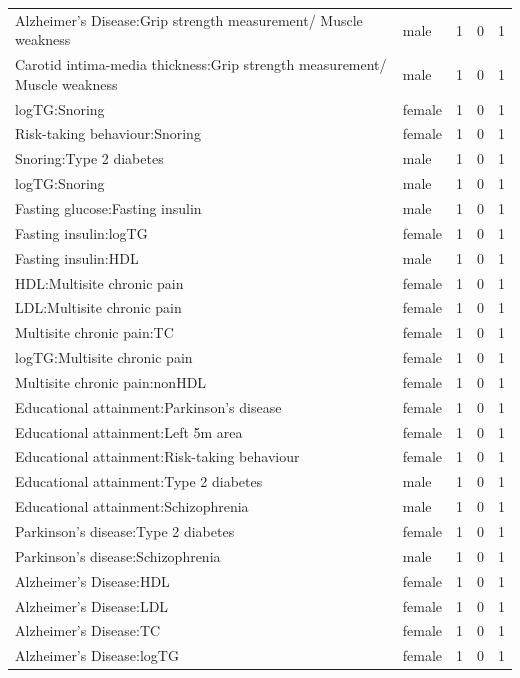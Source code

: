 \begin{table}[ht]
\begin{tabular}{llrrr}
  Alzheimer's Disease:Grip strength measurement/ Muscle weakness & male &   1 &   0 &   1 \\ 
  Carotid intima-media thickness:Grip strength measurement/ Muscle weakness & male &   1 &   0 &   1 \\ 
  logTG:Snoring & female &   1 &   0 &   1 \\ 
  Risk-taking behaviour:Snoring & female &   1 &   0 &   1 \\ 
  Snoring:Type 2 diabetes & male &   1 &   0 &   1 \\ 
  logTG:Snoring & male &   1 &   0 &   1 \\ 
  Fasting glucose:Fasting insulin & male &   1 &   0 &   1 \\ 
  Fasting insulin:logTG & female &   1 &   0 &   1 \\ 
  Fasting insulin:HDL & male &   1 &   0 &   1 \\ 
  HDL:Multisite chronic pain & female &   1 &   0 &   1 \\ 
  LDL:Multisite chronic pain & female &   1 &   0 &   1 \\ 
  Multisite chronic pain:TC & female &   1 &   0 &   1 \\ 
  logTG:Multisite chronic pain & female &   1 &   0 &   1 \\ 
  Multisite chronic pain:nonHDL & female &   1 &   0 &   1 \\ 
  Educational attainment:Parkinson's disease & female &   1 &   0 &   1 \\ 
  Educational attainment:Left 5m area & female &   1 &   0 &   1 \\ 
  Educational attainment:Risk-taking behaviour & female &   1 &   0 &   1 \\ 
  Educational attainment:Type 2 diabetes & male &   1 &   0 &   1 \\ 
  Educational attainment:Schizophrenia & male &   1 &   0 &   1 \\ 
  Parkinson's disease:Type 2 diabetes & female &   1 &   0 &   1 \\ 
  Parkinson's disease:Schizophrenia & male &   1 &   0 &   1 \\ 
  Alzheimer's Disease:HDL & female &   1 &   0 &   1 \\ 
  Alzheimer's Disease:LDL & female &   1 &   0 &   1 \\ 
  Alzheimer's Disease:TC & female &   1 &   0 &   1 \\ 
  Alzheimer's Disease:logTG & female &   1 &   0 &   1 \\ 

\end{tabular}
\end{table}
